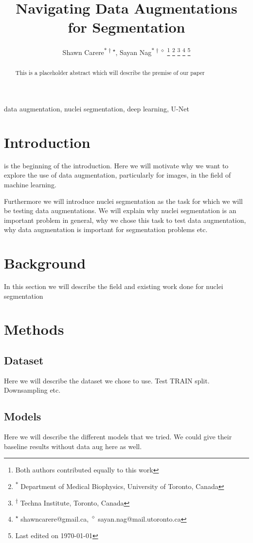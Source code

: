 \documentclass[journal, final]{IEEEtran}
\title{Navigating Data Augmentations for Segmentation}
\author{
    Shawn Carere\textsuperscript{$\ast \dagger \star$}, 
    Sayan Nag\textsuperscript{$\ast \dagger \diamond$}
    \thanks{Both authors contributed equally to this work}
    \thanks{\textsuperscript{$\ast$} Department of Medical Biophysics, University of Toronto, Canada}
    \thanks{\textsuperscript{$\dagger$} Techna Institute, Toronto, Canada}
    \thanks{
        \textsuperscript{$\star$} shawncarere@gmail.ca, 
        \textsuperscript{$\diamond$} sayan.nag@mail.utoronto.ca
        }
    \thanks{Last edited on \today}
    }
\begin{document}
    \maketitle

    \begin{abstract}
        This is a placeholder abstract which will describe the premise
        of our paper
    \end{abstract}

    \begin{IEEEkeywords}
        data augmentation, nuclei segmentation, deep learning, U-Net
    \end{IEEEkeywords}

    \section{Introduction}\label{s:intro}
         is the beginning of the introduction. Here
        we will motivate why we want to explore the use of data augmentation,
        particularly for images, in the field of machine learning. 
        
        Furthermore
        we will introduce nuclei segmentation as the task for which we will
        be testing data augmentations. We will explain why nuclei
        segmentation is an important problem in general, why we chose this
        task to test data augmentation, why data augmentation is important
        for segmentation problems etc.
    \section{Background}\label{s:background}
        In this section we will describe the field and existing work done
        for nuclei segmentation
    \section{Methods}\label{s:methods}
        \subsection{Dataset}\label{ss:dataset}
            Here we will describe the dataset we chose to use. Test TRAIN
            split. Downsampling etc.
        \subsection{Models}\label{ss:models}
            Here we will describe the different models that we tried.
            We could give their baseline results without data aug here as
            well.
\end{document}
